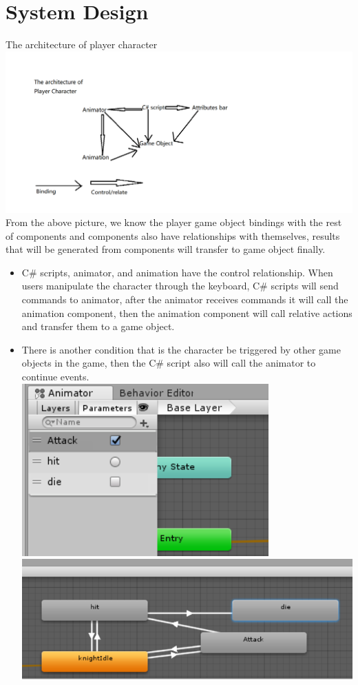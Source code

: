 \chapter{System Design}
The architecture of player character\\
\includegraphics[scale=0.5]{img/ArchitectureOfPlayer.png}\\
From the above picture, we know the player game object bindings with the rest of components and components also have relationships with themselves, results that will be generated from components will transfer to game object finally.    
\begin{itemize}
\item C\# scripts, animator, and animation have the control relationship. When users manipulate the character through the keyboard, C\# scripts will send commands to animator, after the animator receives commands it will call the animation component, then the animation component will call relative actions and transfer them to a game object.\\
\item There is another condition that is the character be triggered by other game objects in the game, then the C\# script also will call the animator to continue events. \\
\includegraphics[scale=0.5]{img/PlayerP.png}\\
\includegraphics[scale=0.5]{img/PlayerA.png}\\
\end{itemize}



